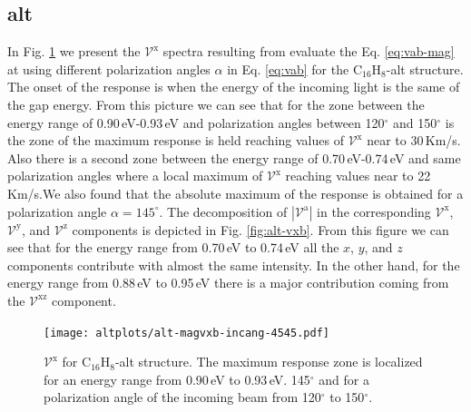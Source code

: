 \documentclass[twocolumn]{article}
\let\Oldsubsection\subsection
\renewcommand{\subsection}{\FloatBarrier\Oldsubsection}
\let\Oldsubsubsection\subsubsection
\renewcommand{\subsubsection}{\FloatBarrier\Oldsubsubsection}
\begin{document}
\subsection{alt} %
\label{sec:results-alt}

In Fig. \ref{fig:alt-magvxbincang} we present the $\mathcal{V}^{\mathrm{x}}$
spectra resulting from evaluate the Eq. \eqref{eq:vab-mag} at using different
polarization angles $\alpha$ in Eq. \eqref{eq:vab} for the C$_16$H$_8$-alt
structure. The onset of the response is when the energy of the incoming light is
the same of the gap energy. From this picture we can see that for the zone
between the energy range of 0.90\,eV-0.93\,eV and polarization angles between
120$^{\circ}$ and 150$^{\circ}$ is the zone of the maximum response is held
reaching values of $\mathcal{V}^{\mathrm{x}}$ near to 30\,Km/s. Also there is a
second zone between the energy range of 0.70\,eV-0.74\,eV and same polarization
angles where a local maximum of $\mathcal{V}^{\mathrm{x}}$ reaching values near
to 22\,Km/s.We also found that the absolute maximum of the response is obtained
for a polarization angle $\alpha = 145^{\circ}$. The decomposition of
$|\mathcal{V}^{\mathrm{a}}|$ in the corresponding $\mathcal{V}^{\mathrm{x}}$,
$\mathcal{V}^{\mathrm{y}}$, and $\mathcal{V}^{\mathrm{z}}$ components is
depicted in Fig. \ref{fig:alt-vxb}. From this figure we can see that for the
energy range from 0.70\,eV to 0.74\,eV all the $x$, $y$, and $z$ components
contribute with almost the same intensity. In the other hand, for the energy
range from 0.88\,eV to 0.95\,eV there is a major contribution coming from the
$\mathcal{V}^{\mathrm{xz}}$ component.

\begin{figure}[]
    \centering
    \texttt{[image: altplots/alt-magvxb-incang-4545.pdf]}
    \caption{$\mathcal{V}^{\mathrm{x}}$ for C$_16$H$_8$-alt structure. The
    maximum response zone is localized for an energy range from 0.90\,eV to
    0.93\,eV. 145$^{\circ}$ and for a polarization angle of the incoming beam from 120$^{\circ}$ to 150$^{\circ}$.}
    \label{fig:alt-magvxbincang}
\end{figure}
\end{document}
